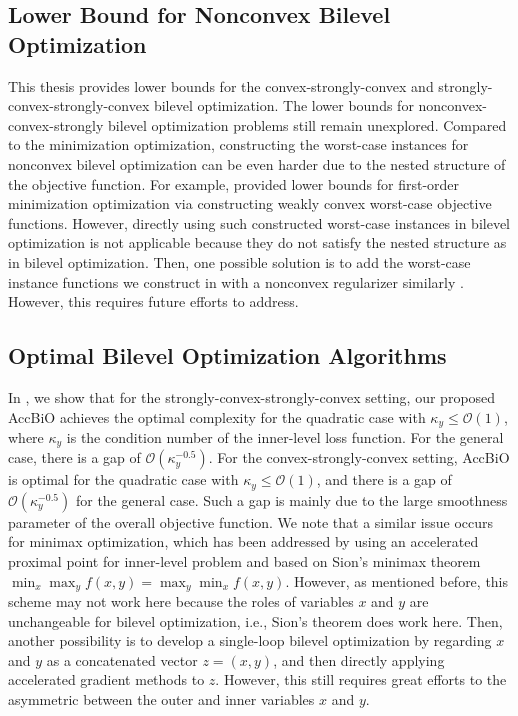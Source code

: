 \documentclass{osudissert96}
\begin{document}
\subsection*{Lower Bound for Nonconvex Bilevel Optimization}
This thesis provides lower bounds for the convex-strongly-convex  and strongly-convex-strongly-convex bilevel optimization. The lower bounds for nonconvex-convex-strongly bilevel optimization problems still remain unexplored. Compared to the minimization optimization, constructing the worst-case instances for nonconvex bilevel optimization can be even harder due to the nested structure of the objective function. For example, \cite{carmon2019lower} provided lower bounds for first-order minimization optimization via constructing weakly convex worst-case objective functions. However, directly using such constructed worst-case instances in bilevel optimization is not applicable because they do not satisfy the nested structure as in bilevel optimization. Then, one possible solution is to add the worst-case instance functions we construct in  with a nonconvex regularizer similarly \cite{carmon2019lower}. However, this requires future efforts to address. 

\subsection*{Optimal Bilevel Optimization Algorithms}
In \cite{ji2021lower}, we show that 
 for the strongly-convex-strongly-convex setting, our proposed AccBiO achieves the optimal complexity for the quadratic case with $\kappa_y\leq\mathcal{O}(1)$, where $\kappa_y$ is the condition number of the inner-level loss function. For the general case, there is a gap of $\mathcal{O}(\kappa_y^{-0.5})$. For the convex-strongly-convex setting, AccBiO is optimal for the quadratic case with $ \kappa_y\leq \mathcal{O}(1)$, and there is a gap of $\mathcal{O}(\kappa_y^{-0.5})$ for the general case. Such a gap is mainly due to the large smoothness parameter of the overall objective function. We note that a similar issue occurs for minimax optimization, which has been addressed by \cite{lin2020near} using an accelerated proximal point for inner-level problem and based on Sion's minimax theorem $\min_x\max_y f(x,y) =\max_y\min_x f(x,y)$. 
 However, as mentioned before, this scheme may not work here because the roles of variables $x$ and $y$ are unchangeable for bilevel optimization, i.e., Sion's theorem does work here. Then, another possibility is to develop a single-loop bilevel optimization by regarding $x$ and $y$ as a concatenated vector $z=(x,y)$, and then directly applying accelerated gradient methods to $z$. However, this still requires great efforts to the asymmetric between the outer and inner variables $x$ and $y$. 
 
\end{document}
